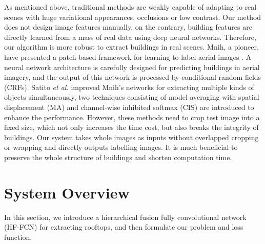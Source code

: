 \documentclass[runningheads]{llncs}
\begin{document}
    As mentioned above, traditional methods are weakly capable of adapting to real scenes with huge variational appearances, occlusions or low contrast. Our method does not design image features manually, on the contrary, building features are directly learned from a mass of real data 
using deep neural networks. Therefore, our algorithm is more robust to  extract buildings in real scenes.  Mnih, a pioneer, have presented a patch-based framework for learning to label aerial images \cite{Mnih2013Machine}. A  neural network architecture is carefully designed for predicting buildings in aerial imagery, and the output of this network is processed by conditional random fields (CRFs). Satito \textit{et al.} \cite{Saito2016Multiple} improved Mnih's networks for extracting multiple kinds of objects simultaneously, two techniques consisting of model averaging with spatial displacement (MA) and channel-wise inhibited softmax (CIS) are introduced to enhance the  performance. However, these methods need to crop test image into a fixed size, which not only increases the time cost, but also breaks the integrity of buildings. Our system takes whole images as inputs without overlapped cropping or wrapping and directly outputs labelling images. It is much beneficial  to preserve the whole structure of buildings and shorten computation time.


   
\section{System Overview} 
\label{section:systemoverview}
   In this section, we introduce a hierarchical fusion fully convolutional network (HF-FCN) for extracting rooftops, and then formulate our problem and loss function.
         
\end{document}
